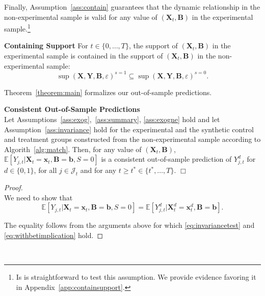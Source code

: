 \noindent Finally, Assumption~\ref{ass:contain} guarantees that the dynamic relationship in the non-experimental sample is valid for any value of $\left( \bm{X}_{t}, \bm{B} \right)$ in the experimental sample.\footnote{Is is straightforward to test this assumption. We provide evidence favoring it in Appendix~\ref{app:containsupport}.}\\

\onehalfspacing
\begin{assumption} \label{ass:contain} \textbf{Containing Support}
For $t \in \{ 0, \ldots, T \}$, the support of $\left( \bm{X}_{t}, \bm{B} \right)$ in the experimental sample is contained in the support of $\left( \bm{X}_{t}, \bm{B} \right)$ in the non-experimental sample: 
\begin{equation}
\sup(\bm{X}, \bm{Y}, \bm{B}, \varepsilon)^{s=1} \subseteq \sup (\bm{X}, \bm{Y}, \bm{B}, \varepsilon)^{s=0}.
\end{equation}
\end{assumption}
\doublespacing

\noindent Theorem~\ref{theorem:main} formalizes our out-of-sample predictions.\\

\onehalfspacing
\begin{theorem} \textbf{Consistent Out-of-Sample Predictions} \label{theorem:main} \\
Let Assumptions~\ref{ass:exog},~\ref{ass:summary}, \ref{ass:exogne} hold and let Assumption~\ref{ass:invariance} hold for the experimental and the synthetic control and treatment groups constructed from the non-experimental sample according to Algorith~\ref{alg:match}. Then, for any value of $\left( \bm{X}_{t}, \bm{B} \right)$, $\mathbb{E} \left[ Y_{j,t} | \bm{X}_{t} = \bm{x}_{t}, \bm{B} = \bm{b}, S = 0 \right]$ is a consistent out-of-sample prediction of $Y_{j,t}^d$ for $d \in \{ 0, 1\}$, for all $j \in \mathcal{J}_{t}$ and for any $t \geq t^* \in \{t^*, \ldots, T \}$. $\Box$ 
\end{theorem}

\noindent \begin{proof}\\
We need to show that  
\begin{equation}
\mathbb{E} \left[ Y_{j,t} | \bm{X}_{t} = \bm{x}_{t}, \bm{B} = \bm{b}, S = 0 \right] = \mathbb{E} \left[ Y_{j,t}^d | \bm{X}_{t}^d = \bm{x}_t^d, \bm{B} = \bm{b}  \right].
\end{equation}

\noindent The equality follows from the arguments above for which \eqref{eq:invariancetest} and \eqref{eq:withbetimplication} hold.
\end{proof}\\
\doublespacing

